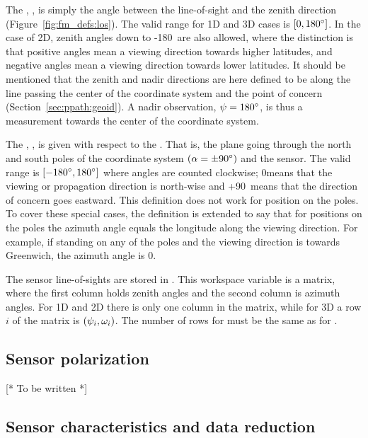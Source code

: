 The , \ZntAng, is simply the angle between the
line-of-sight and the zenith direction (Figure~\ref{fig:fm_defs:los}).
The valid range for 1D and 3D cases is $[0,180^\circ]$. In the case
of 2D, zenith angles down to -180\degree\ are also allowed, where the
distinction is that positive angles mean a viewing direction towards
higher latitudes, and negative angles mean a viewing direction towards
lower latitudes. It should be mentioned that the zenith and nadir
directions are here defined to be along the line passing the center of
the coordinate system and the point of concern
(Section~\ref{sec:ppath:geoid}). A nadir observation,
$\psi=180^\circ$, is thus a measurement towards the center of the
coordinate system.

The , \AzmAng, is given with respect to the
.  That is, the plane going through the
north and south poles of the coordinate system $(\alpha=\pm90^\circ)$
and the sensor. The valid range is $[-180^\circ,180^\circ]$ where
angles are counted clockwise; 0\degree means that the viewing or
propagation direction is north-wise and +90\degree\ means that the
direction of concern goes eastward. This definition does not work for
position on the poles. To cover these special cases, the definition is
extended to say that for positions on the poles the azimuth angle
equals the longitude along the viewing direction. For example, if
standing on any of the poles and the viewing direction is towards
Greenwich, the azimuth angle is 0\degree.

The sensor line-of-sights are stored in . This
workspace variable is a matrix, where the first column holds zenith
angles and the second column is azimuth angles. For 1D and 2D there is
only one column in the matrix, while for 3D a row $i$ of the matrix is
$(\psi_{i},\omega_{i})$. The number of rows for
 must be the same as for
.


\subsection{Sensor polarization}
\label{sec:fm_defs:sensorpol}

[* To be written *]



\subsection{Sensor characteristics and data reduction}
\label{sec:fm_defs:sensorchar}

